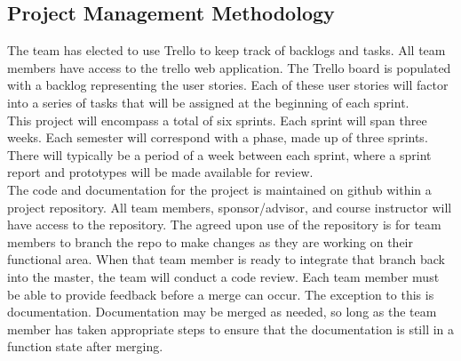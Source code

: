 \subsection{Project  Management Methodology}
% 

The team has elected to use Trello to keep track of backlogs and tasks. All team members have access to the trello web application. The Trello board is populated with a backlog representing the user stories. Each of these user stories will factor into a series of tasks that will be assigned at the beginning of each sprint.\\

This project will encompass a total of six sprints. Each sprint will span three weeks. Each semester will correspond with a phase, made up of three sprints. There will typically be a period of a week between each sprint, where a sprint report and prototypes will be made available for review.\\

The code and documentation for the project is maintained on github within a project repository. All team members, sponsor/advisor, and course instructor will have access to the repository. The agreed upon use of the repository is for team members to branch the repo to make changes as they are working on their functional area. When that team member is ready to integrate that branch back into the master, the team will conduct a code review. Each team member must be able to provide feedback before a merge can occur. The exception to this is documentation. Documentation may be merged as needed, so long as the team member has taken appropriate steps to ensure that the documentation is still in a function state after merging.\\

